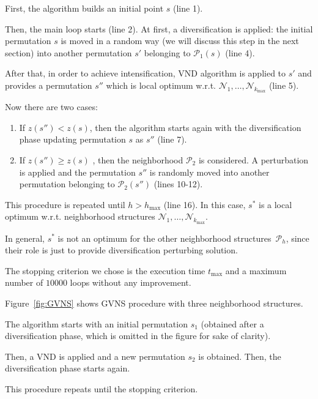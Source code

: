 First, the algorithm builds an initial point $s$ (line 1).

Then, the main loop starts (line 2). At first, a diversification is applied: the initial permutation $s$ is moved in a random way (we will discuss this step in the next section) into another permutation $s'$ belonging to $\mathcal P_1(s)$ (line 4).

After that, in order to achieve intensification, VND algorithm is applied to $s'$ and provides a permutation $s''$ which is local optimum w.r.t. $\mathcal N_1,\dots,\mathcal N_{k_\mathrm{max}} $ (line 5).

Now there are two cases:
\begin{enumerate}
	\item If $z(s'')<z(s)$, then the algorithm starts again with the diversification phase updating permutation $s$ as $s''$ (line 7).
	 \item If $z(s'')\ge z(s)$ , then the neighborhood $\mathcal P_2$ is considered. A perturbation is applied and the permutation $s''$ is randomly moved into another permutation belonging to $\mathcal P_2(s'')$ (lines 10-12).
\end{enumerate}

This procedure is repeated until $h>h_\mathrm{max}$ (line 16). In this case, $s^*$ is a local optimum w.r.t. neighborhood structures $\mathcal N_1,\dots, \mathcal N_{k_\mathrm{max}}$. 

In general, $s^*$ is not an optimum for the other neighborhood structures~$\mathcal P_h$, since their role is just to provide diversification perturbing solution.


The stopping criterion we chose is the execution time $t_\mathrm{max}$ and a maximum number of $\num{10000}$ loops without any improvement. 






Figure~\ref{fig:GVNS} shows GVNS procedure with three neighborhood structures.

	The algorithm starts with an initial permutation $s_1$ (obtained after a diversification phase, which is omitted in the figure for sake of clarity). 
	
Then, a VND is applied and a new permutation $s_2$ is obtained. Then, the diversification phase starts again.

This procedure repeats until the stopping criterion.



